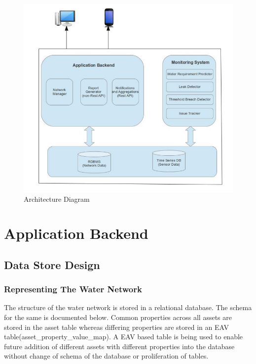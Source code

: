 \documentclass[11pt]{report} %
\begin{document}
\begin{figure}[h!]
  \caption{Architecture Diagram}
  \centering
    \includegraphics[scale=0.5]{HLD.png}
\end{figure}



\section{Application Backend}
\subsection{Data Store Design}
\subsubsection{Representing The Water Network}
The structure of the water network is stored in a relational database. The schema for the same is documented below. Common properties across all assets are stored in the asset table whereas differing properties are stored in an EAV table(asset\_property\_value\_map). A EAV based table is being used to enable future addition of different assets with different properties into the database without change of schema of the database or proliferation of tables.
\end{document}
